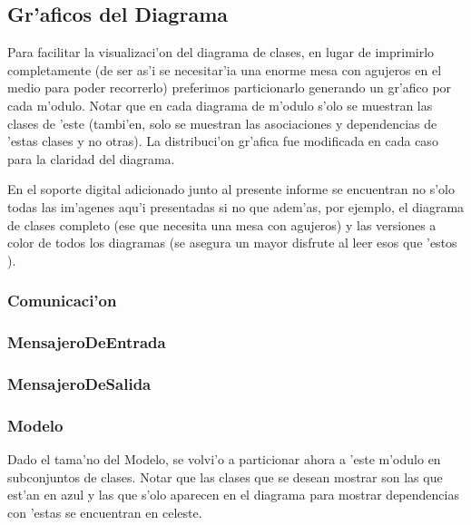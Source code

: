 \subsection{Gr'aficos del Diagrama}
Para facilitar la visualizaci'on del diagrama de clases, en lugar de imprimirlo completamente (de ser as'i se necesitar'ia una enorme mesa con agujeros en el medio para poder recorrerlo) preferimos particionarlo generando un gr'afico por cada m'odulo. Notar que en cada diagrama de m'odulo s'olo se muestran las clases de 'este (tambi'en, solo se muestran las asociaciones y dependencias de 'estas clases y no otras). La distribuci'on gr'afica fue modificada en cada caso para la claridad del diagrama. 

En el soporte digital adicionado junto al presente informe se encuentran no s'olo todas las im'agenes aqu'i presentadas si no que adem'as, por ejemplo, el diagrama de clases completo (ese que necesita una mesa con agujeros) y las versiones a color de todos los diagramas (se asegura un mayor disfrute al leer esos que 'estos ).
\clearpage


\subsubsection{Comunicaci'on}
\clearpage

\subsubsection{MensajeroDeEntrada}
\clearpage

\subsubsection{MensajeroDeSalida}
\clearpage

\subsubsection{Modelo}
Dado el tama'no del Modelo, se volvi'o a particionar ahora a 'este m'odulo en subconjuntos de clases. Notar que las clases que se desean mostrar son las que est'an en azul y las que s'olo aparecen en el diagrama para mostrar dependencias con 'estas se encuentran en celeste.


